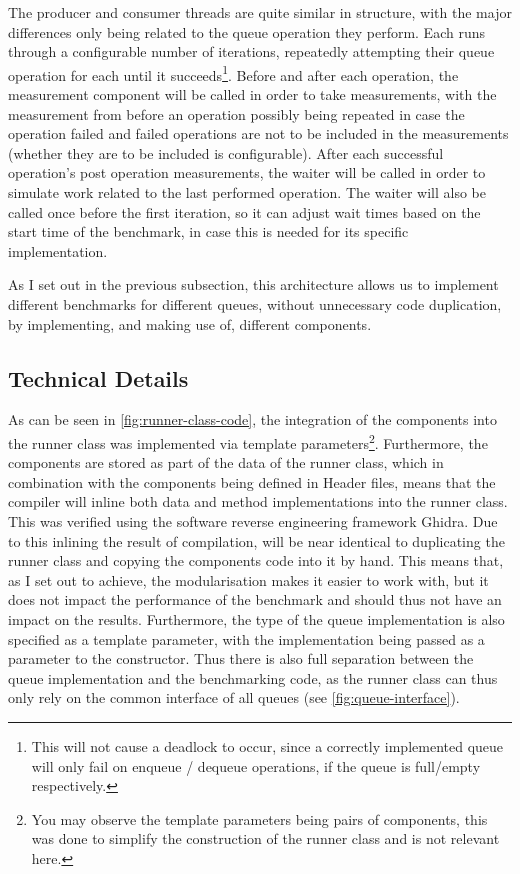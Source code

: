 The producer and consumer threads are quite similar in structure, with the major differences only being
related to the queue operation they perform.
Each runs through a configurable number of iterations, repeatedly attempting their queue operation for each
until it succeeds\footnote{This will not cause a deadlock to occur, since a correctly implemented queue will
only fail on enqueue / dequeue operations, if the queue is full/empty respectively.}.
Before and after each operation, the measurement component will be called in order to take measurements, with
the measurement from before an operation possibly being repeated in case the operation failed and failed
operations are not to be included in the measurements (whether they are to be included is configurable).
After each successful operation's post operation measurements, the waiter will be called in order to simulate
work related to the last performed operation.
The waiter will also be called once before the first iteration, so it can adjust wait times based on the
start time of the benchmark, in case this is needed for its specific implementation.

As I set out in the previous subsection, this architecture allows us to implement different benchmarks for
different queues, without unnecessary code duplication, by implementing, and making use of, different components.

\subsection{Technical Details}
\label{sec:framework-technical-details}



As can be seen in \autoref{fig:runner-class-code}, the integration of the components into the runner class
was implemented via template parameters\footnote{You may observe the template parameters being pairs of
components, this was done to simplify the construction of the runner class and is not relevant here.}.
Furthermore, the components are stored as part of the data of the runner class, which in combination with the
components being defined in Header files, means that the compiler will inline both data and method
implementations into the runner class.
This was verified using the software reverse engineering framework Ghidra.
Due to this inlining the result of compilation, will be near identical to duplicating the runner class and
copying the components code into it by hand.
This means that, as I set out to achieve, the modularisation makes it easier to work with, but it does not
impact the performance of the benchmark and should thus not have an impact on the results.
Furthermore, the type of the queue implementation is also specified as a template parameter, with the
implementation being passed as a parameter to the constructor.
Thus there is also full separation between the queue implementation and the benchmarking code, as the runner
class can thus only rely on the common interface of all queues (see \autoref{fig:queue-interface}).

